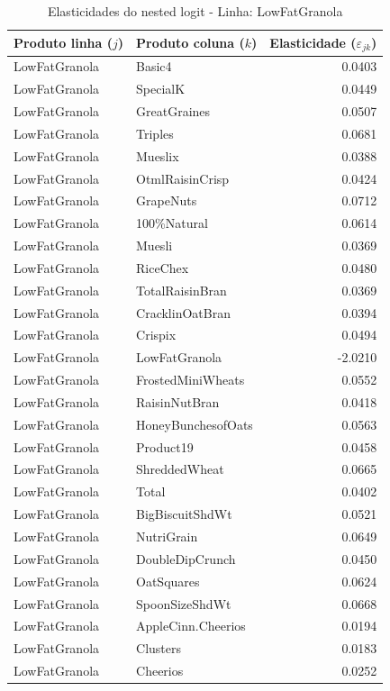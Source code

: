 \begingroup
\begin{table}[H]
\centering
\caption{Elasticidades do nested logit - Linha: LowFatGranola}
\label{tab:elas-nested-lowfatgranola}
\small
\begin{tabular}{llr}
\toprule
Produto linha ($j$) & Produto coluna ($k$) & Elasticidade ($\varepsilon_{jk}$) \\
\midrule
LowFatGranola & Basic4 & 0.0403 \\
LowFatGranola & SpecialK & 0.0449 \\
LowFatGranola & GreatGraines & 0.0507 \\
LowFatGranola & Triples & 0.0681 \\
LowFatGranola & Mueslix & 0.0388 \\
LowFatGranola & OtmlRaisinCrisp & 0.0424 \\
LowFatGranola & GrapeNuts & 0.0712 \\
LowFatGranola & 100\%Natural & 0.0614 \\
LowFatGranola & Muesli & 0.0369 \\
LowFatGranola & RiceChex & 0.0480 \\
LowFatGranola & TotalRaisinBran & 0.0369 \\
LowFatGranola & CracklinOatBran & 0.0394 \\
LowFatGranola & Crispix & 0.0494 \\
LowFatGranola & LowFatGranola & -2.0210 \\
LowFatGranola & FrostedMiniWheats & 0.0552 \\
LowFatGranola & RaisinNutBran & 0.0418 \\
LowFatGranola & HoneyBunchesofOats & 0.0563 \\
LowFatGranola & Product19 & 0.0458 \\
LowFatGranola & ShreddedWheat & 0.0665 \\
LowFatGranola & Total & 0.0402 \\
LowFatGranola & BigBiscuitShdWt & 0.0521 \\
LowFatGranola & NutriGrain & 0.0649 \\
LowFatGranola & DoubleDipCrunch & 0.0450 \\
LowFatGranola & OatSquares & 0.0624 \\
LowFatGranola & SpoonSizeShdWt & 0.0668 \\
LowFatGranola & AppleCinn.Cheerios & 0.0194 \\
LowFatGranola & Clusters & 0.0183 \\
LowFatGranola & Cheerios & 0.0252 \\

\end{tabular}
\end{table}
